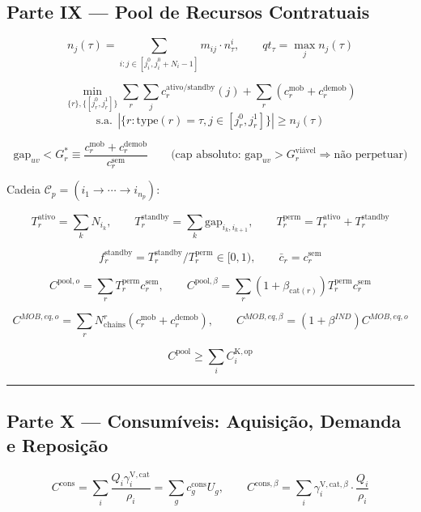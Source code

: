 \documentclass[
  10pt,
]{article}
\begin{document}
\hypertarget{parte-ix-pool-de-recursos-contratuais}{%
\subsection{Parte IX --- Pool de Recursos
Contratuais}\label{parte-ix-pool-de-recursos-contratuais}}

\[n_j(\tau)=\sum_{i:j\in[j_i^0,j_i^0+N_i-1]}m_{ij}\cdot n_\tau^i, \qquad qt_\tau=\max_jn_j(\tau)\]

\[\min_{\{r\},\{[j_r^0,j_r^1]\}}\sum_r\sum_jc_r^{\text{ativo/standby}}(j)+\sum_r(c_r^{\text{mob}}+c_r^{\text{demob}})\]
\[\text{s.a.}\ \ |\{r:\text{type}(r)=\tau,j\in[j_r^0,j_r^1]\}|\ge n_j(\tau)\]

\[\text{gap}_{uv}<G_r^*\equiv\frac{c_r^{\text{mob}}+c_r^{\text{demob}}}{c_r^{\text{sem}}} \qquad\text{(cap absoluto: }\text{gap}_{uv}>G_r^{\text{viável}}\Rightarrow\text{não perpetuar)}\]

Cadeia \(\mathcal{C}_p=(i_1\to\cdots\to i_{n_p})\):

\[T_r^{\text{ativo}}=\sum_kN_{i_k}, \qquad T_r^{\text{standby}}=\sum_k\text{gap}_{i_k,i_{k+1}}, \qquad T_r^{\text{perm}}=T_r^{\text{ativo}}+T_r^{\text{standby}}\]

\[\boxed{f_r^{\text{standby}}=T_r^{\text{standby}}/T_r^{\text{perm}}\in[0,1)}, \qquad \boxed{\bar{c}_r=c_r^{\text{sem}}}\]

\[\boxed{C^{\text{pool},o}=\sum_rT_r^{\text{perm}}c_r^{\text{sem}}}, \qquad C^{\text{pool},\beta}=\sum_r(1+\beta_{\text{cat}(r)})T_r^{\text{perm}}c_r^{\text{sem}}\]

\[C^{MOB,eq,o}=\sum_rN_{\text{chains}}^r(c_r^{\text{mob}}+c_r^{\text{demob}}), \qquad C^{MOB,eq,\beta}=(1+\beta^{IND})C^{MOB,eq,o}\]

\[\boxed{C^{\mathrm{pool}}\ge\sum_iC_i^{\mathrm{K,op}}}\]

\begin{center}\rule{0.5\linewidth}{0.5pt}\end{center}

\hypertarget{parte-x-consumuxedveis-aquisiuxe7uxe3o-demanda-e-reposiuxe7uxe3o}{%
\subsection{Parte X --- Consumíveis: Aquisição, Demanda e
Reposição}\label{parte-x-consumuxedveis-aquisiuxe7uxe3o-demanda-e-reposiuxe7uxe3o}}

\[\boxed{C^{\mathrm{cons}}=\sum_i\frac{Q_i\gamma_i^{\mathrm{V,cat}}}{\rho_i}=\sum_gc_g^{\mathrm{cons}}U_g}, \qquad C^{\mathrm{cons},\beta}=\sum_i\gamma_i^{\mathrm{V,cat},\beta}\cdot\frac{Q_i}{\rho_i}\]
\end{document}
